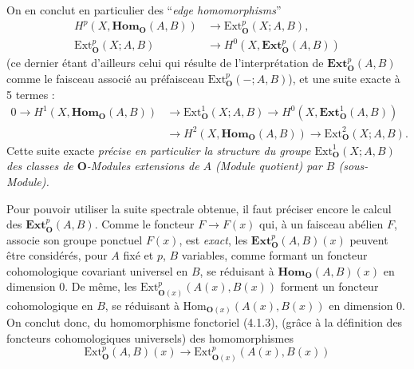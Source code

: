 On en conclut en particulier des ``\textit{edge homomorphisms}''
\[
\tag{4.2.6}
\begin{aligned}
H^p(X,\mathbf{Hom}_{\mathbf O}(A,B))&\to
  \mathrm{Ext}_{\mathbf O}^p(X;A,B),\\
\mathrm{Ext}_{\mathbf O}^p(X;A,B)&\to
  H^0(X,\mathbf{Ext}_{\mathbf O}^p(A,B))
\end{aligned}
\]
(ce dernier étant d'ailleurs celui qui résulte de l'interprétation de
$\mathbf{Ext}_{\mathbf O}^p(A,B)$ comme le faisceau associé au préfaisceau
$\mathrm{Ext}_{\mathbf O}^p(-;A,B)$), et une suite exacte à 5 termes :
\[
\tag{4.2.7}
\begin{aligned}
0\to H^1(X,\mathbf{Hom}_{\mathbf O}(A,B))
&\to \mathrm{Ext}_{\mathbf O}^1(X;A,B)
\to H^0(X,\mathbf{Ext}_{\mathbf O}^1(A,B))\\
&\to H^2(X,\mathbf{Hom}_{\mathbf O}(A,B))
\to \mathrm{Ext}_{\mathbf O}^2(X;A,B).
\end{aligned}
\]
Cette suite exacte \textit{précise en particulier la structure du groupe
$\mathrm{Ext}_{\mathbf O}^1(X;A,B)$ des classes de ${\mathbf O}$-Modules extensions de $A$
\textup{(Module quotient)} par $B$ \textup{(sous-Module).}}

Pour pouvoir utiliser la suite spectrale obtenue, il faut préciser encore le
calcul des $\mathbf{Ext}_{\mathbf O}^p(A,B)$. Comme le foncteur $F\to F(x)$ qui,
à un faisceau abélien $F$, associe son groupe ponctuel $F(x)$, est \textit{exact}, les
$\mathbf{Ext}_{\mathbf O}^p(A,B)(x)$ peuvent être considérés, pour $A$ fixé et $p$, $B$
variables, comme formant un foncteur cohomologique covariant universel en $B$,
se réduisant à $\mathbf{Hom}_{\mathbf O}(A,B)(x)$ en dimension 0. De même, les
$\mathrm{Ext}_{{\mathbf O}(x)}^p(A(x),B(x))$ forment un foncteur cohomologique en $B$,
se réduisant à $\mathrm{Hom}_{{\mathbf O}(x)}(A(x),B(x))$ en dimension 0. On conclut
donc, du homomorphisme fonctoriel (4.1.3), (grâce à la définition des
foncteurs cohomologiques universels) des homomorphismes
\[
\tag{4.2.8}
\mathrm{Ext}_{\mathbf O}^p(A,B)(x)\to
\mathrm{Ext}_{{\mathbf O}(x)}^p(A(x),B(x))
\]

